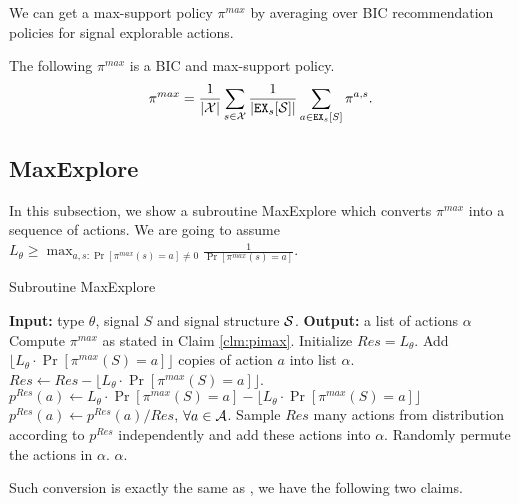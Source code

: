 We can get a max-support policy $\pi^{max}$ by averaging over BIC recommendation policies for signal explorable actions.
\begin{claim}
\label{clm:pimax}
The following $\pi^{max}$ is a BIC and max-support policy.
\[
\pi^{max} = \frac{1}{|\X|} \sum_{s \in \X} \frac{1}{|\EX_s[\S]|} \sum_{a \in \EX_s[S]} \pi^{a,s}.
\]
\end{claim}

\subsection{MaxExplore}
\label{sec:public_maxe}

In this subsection, we show a subroutine MaxExplore which converts $\pi^{max}$ into a sequence of actions. We are going to assume $L_{\theta} \geq \max_{a,s: \Pr[\pi^{max}(s)=a] \neq 0} \frac{1}{\Pr[\pi^{max}(s)=a]}$.
 \begin{algorithm}[H]
    \caption{Subroutine MaxExplore}
    	\label{alg:public_explore}
    \begin{algorithmic}[1]
	\STATE \textbf{Input:} type $\theta$, signal $S$ and signal structure $\S$.
	\STATE \textbf{Output:} a list of actions $\alpha$
	\STATE Compute $\pi^{max}$ as stated in Claim \ref{clm:pimax}.
		\STATE Initialize $Res = L_{\theta}$.
                     		\STATE Add $\lfloor L_{\theta} \cdot \Pr[\pi^{max}(S) = a]\rfloor$ copies of action $a$ into list $\alpha$.
			\STATE $Res \leftarrow Res -\lfloor L_{\theta} \cdot \Pr[\pi^{max}(S) = a] \rfloor $.
			\STATE $p^{Res}(a)\leftarrow  L_{\theta} \cdot \Pr[\pi^{max}(S) = a] -  \lfloor L_{\theta} \cdot \Pr[\pi^{max}(S) = a]\rfloor$
		\ENDFOR
		\STATE $p^{Res}(a) \leftarrow p^{Res}(a) / Res$, $\forall a \in \A$.
		\STATE Sample $Res$ many actions from distribution according to $p^{Res}$ independently and add these actions into $\alpha$.
		\STATE Randomly permute the actions in $\alpha$.
	\RETURN $\alpha$.	
     \end{algorithmic}
\end{algorithm}

Such conversion is exactly the same as \cite{ICexplorationGames-ec16-working}, we have the following two claims.

